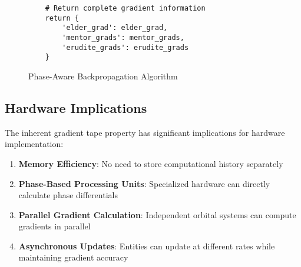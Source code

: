 \begin{figure}[h]
\begin{center}
\begin{minipage}{0.95\textwidth}
\begin{verbatim}
    # Return complete gradient information
    return {
        'elder_grad': elder_grad,
        'mentor_grads': mentor_grads,
        'erudite_grads': erudite_grads
    }
\end{verbatim}
\end{minipage}
\caption{Phase-Aware Backpropagation Algorithm}
\end{center}
\end{figure}

\subsection{Hardware Implications}

The inherent gradient tape property has significant implications for hardware implementation:

\begin{enumerate}
    \item \textbf{Memory Efficiency}: No need to store computational history separately
    \item \textbf{Phase-Based Processing Units}: Specialized hardware can directly calculate phase differentials
    \item \textbf{Parallel Gradient Calculation}: Independent orbital systems can compute gradients in parallel
    \item \textbf{Asynchronous Updates}: Entities can update at different rates while maintaining gradient accuracy
\end{enumerate}


